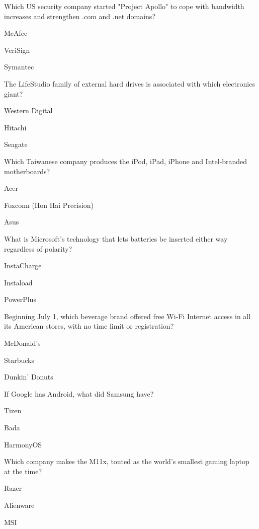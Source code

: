 \begin{enhancedmcq}{Which US security company started "Project Apollo" to cope with bandwidth increases and strengthen .com and .net domains?}
\item McAfee
\item VeriSign
\item Symantec

\end{enhancedmcq}
\begin{enhancedmcq}{The LifeStudio family of external hard drives is associated with which electronics giant?}
\item Western Digital
\item Hitachi
\item Seagate

\end{enhancedmcq}
\begin{enhancedmcq}{Which Taiwanese company produces the iPod, iPad, iPhone and Intel‑branded motherboards?}
\item Acer
\item Foxconn (Hon Hai Precision)
\item Asus

\end{enhancedmcq}
\begin{enhancedmcq}{What is Microsoft's technology that lets batteries be inserted either way regardless of polarity?}
\item InstaCharge
\item Instaload
\item PowerPlus

\end{enhancedmcq}
\begin{enhancedmcq}{Beginning July 1, which beverage brand offered free Wi‑Fi Internet access in all its American stores, with no time limit or registration?}
\item McDonald's
\item Starbucks
\item Dunkin' Donuts

\end{enhancedmcq}
\begin{enhancedmcq}{If Google has Android, what did Samsung have?}
\item Tizen
\item Bada
\item HarmonyOS

\end{enhancedmcq}
\begin{enhancedmcq}{Which company makes the M11x, touted as the world's smallest gaming laptop at the time?}
\item Razer
\item Alienware
\item MSI

\end{enhancedmcq}
